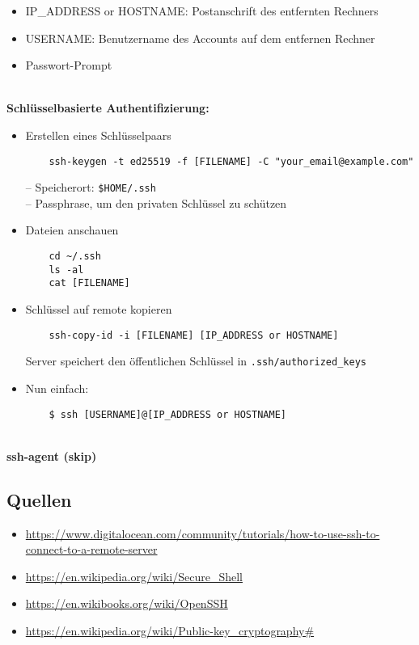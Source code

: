 \begin{itemize}
	\item IP\_ADDRESS or HOSTNAME: Postanschrift des entfernten Rechners
	\item USERNAME: Benutzername des Accounts auf dem entfernen Rechner
	\item Passwort-Prompt
\end{itemize}
%
~\\
\textbf{Schlüsselbasierte Authentifizierung:}
\begin{itemize}
	\item Erstellen eines Schlüsselpaars
	\begin{verbatim}
	ssh-keygen -t ed25519 -f [FILENAME] -C "your_email@example.com"
	\end{verbatim}
	-- Speicherort: \texttt{\$HOME/.ssh}\\
	-- Passphrase, um den privaten Schlüssel zu schützen
	\item Dateien anschauen
	\begin{verbatim}
	cd ~/.ssh
	ls -al
	cat [FILENAME]
	\end{verbatim}
	\item Schlüssel auf remote kopieren
	\begin{verbatim}
	ssh-copy-id -i [FILENAME] [IP_ADDRESS or HOSTNAME]	
	\end{verbatim}
	Server speichert den öffentlichen Schlüssel in \texttt{.ssh/authorized\_keys}
	\item Nun einfach:
	\begin{verbatim}
	$ ssh [USERNAME]@[IP_ADDRESS or HOSTNAME]
	\end{verbatim}
\end{itemize}
%
~\\ \textbf{ssh-agent (skip)}




\subsection{Quellen}
\begin{itemize}
	\item \url{https://www.digitalocean.com/community/tutorials/how-to-use-ssh-to-connect-to-a-remote-server}
	\item \url{https://en.wikipedia.org/wiki/Secure_Shell}
	\item \url{https://en.wikibooks.org/wiki/OpenSSH}
	\item \url{https://en.wikipedia.org/wiki/Public-key_cryptography#}
\end{itemize}